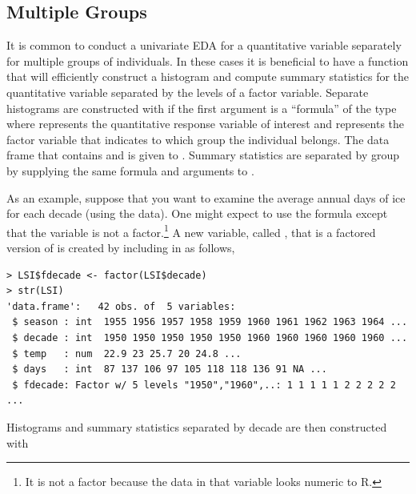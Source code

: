 \documentclass[10pt,openany]{book}\usepackage[]{graphicx}\usepackage[]{color}
\makeatletter
\newenvironment{kframe}{%
 \def\at@end@of@kframe{}%
 \ifinner\ifhmode%
  \def\at@end@of@kframe{\end{minipage}}%
  \begin{minipage}{\columnwidth}%
 \fi\fi%
 \def\FrameCommand##1{\hskip\@totalleftmargin \hskip-\fboxsep
 \colorbox{shadecolor}{##1}\hskip-\fboxsep
     \hskip-\linewidth \hskip-\@totalleftmargin \hskip\columnwidth}%
 \MakeFramed {\advance\hsize-\width
   \@totalleftmargin\z@ \linewidth\hsize
   \@setminipage}}%
 {\par\unskip\endMakeFramed%
 \at@end@of@kframe}
\newenvironment{knitrout}{}{} %
\makeatother
\begin{document}
\subsection{Multiple Groups} \label{sect:MultGroups}
It is common to conduct a univariate EDA for a quantitative variable separately for multiple groups of individuals.  In these cases it is beneficial to have a function that will efficiently construct a histogram and compute summary statistics for the quantitative variable separated by the levels of a factor variable.  Separate histograms are constructed with  if the first argument is a ``formula'' of the type  where  represents the quantitative response variable of interest and  represents the factor variable that indicates to which group the individual belongs.  The data frame that contains  and  is given to .  Summary statistics are separated by group by supplying the same formula and  arguments to .

As an example, suppose that you want to examine the average annual days of ice for each decade (using the  data).  One might expect to use the  formula except that the  variable is not a factor.\footnote{It is not a factor because the data in that variable looks numeric to R.}  A new variable, called , that is a factored version of  is created by including  in  as follows,
\begin{knitrout}
\color{fgcolor}\begin{kframe}
\begin{verbatim}
> LSI$fdecade <- factor(LSI$decade)
> str(LSI)
'data.frame':	42 obs. of  5 variables:
 $ season : int  1955 1956 1957 1958 1959 1960 1961 1962 1963 1964 ...
 $ decade : int  1950 1950 1950 1950 1950 1960 1960 1960 1960 1960 ...
 $ temp   : num  22.9 23 25.7 20 24.8 ...
 $ days   : int  87 137 106 97 105 118 118 136 91 NA ...
 $ fdecade: Factor w/ 5 levels "1950","1960",..: 1 1 1 1 1 2 2 2 2 2 ...
\end{verbatim}
\end{kframe}
\end{knitrout}

Histograms  and summary statistics separated by decade are then constructed with
\end{document}
